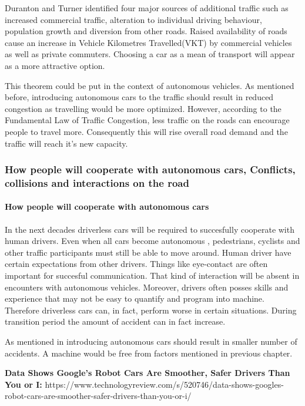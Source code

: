 \documentclass[11pt,english]{article}
\begin{document}
Duranton and Turner identified four major sources of additional traffic such as increased commercial traffic, alteration to individual driving behaviour, population growth and diversion from other roads. Raised availability of roads cause an increase in Vehicle Kilometres Travelled(VKT) by commercial vehicles as well as private commuters. Choosing a car as a mean of transport will appear as a more attractive option. 


This theorem could be put in the context of autonomous vehicles. As mentioned before, introducing autonomous cars to the traffic should result in reduced congestion as travelling would be more optimized. However, according to the Fundamental Law of Traffic Congestion, less traffic on the roads can encourage people to travel more. Consequently this will rise overall road demand and the traffic will reach it's new capacity.


\subsubsection{How people will cooperate with autonomous cars, Conflicts, collisions and interactions on the road}


\paragraph{How people will cooperate with autonomous cars}
In the next decades driverless cars will be required to succesfully cooperate with human drivers. Even when all cars become autonomous , pedestrians, cyclists and other traffic participants must still be able to move around. 
Human driver have certain expectations from other drivers. Things like eye-contact are often important for succesful communication. That kind of interaction will be absent in encounters with autonomous vehicles. Moreover, drivers often posses skills and experience that may not be easy to quantify and program into machine. Therefore driverless cars can, in fact, perform worse in certain situations\citep{sivak2015road}. During transition period the amount of accident can in fact increase.

As mentioned in %
introducing autonomous cars should result in smaller number of accidents. A machine would be free from factors mentioned in previous chapter. 



\textbf{Data Shows Google’s Robot Cars Are Smoother, Safer Drivers Than You or I:}
https://www.technologyreview.com/s/520746/data-shows-googles-robot-cars-are-smoother-safer-drivers-than-you-or-i/
\end{document}
